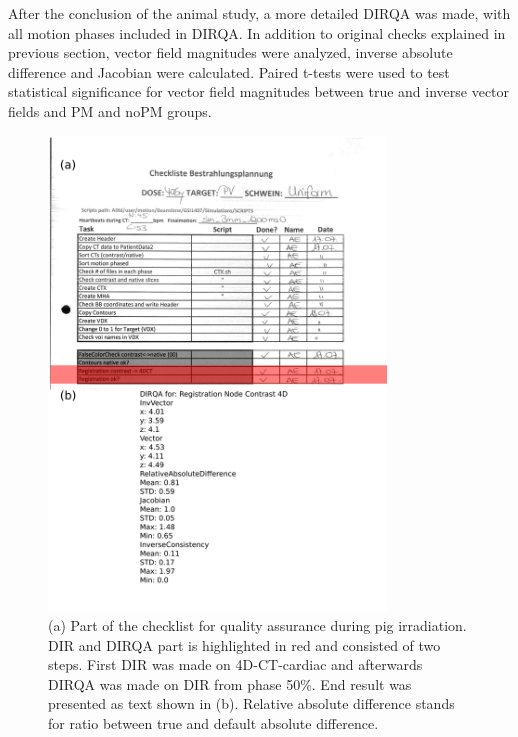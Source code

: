 \documentclass[type=dr, dr=rernat, accentcolor=tud7b,colorbacktitle, bigchapter, openright, twoside, 12pt ]{tudthesis}
\begin{document}
After the conclusion of the animal study, a more detailed DIRQA was made, with all motion phases included in DIRQA. In addition to original checks explained in previous section, vector field magnitudes were analyzed, inverse absolute difference
and Jacobian were calculated. Paired t-tests were used to test statistical significance for vector field magnitudes between true and inverse vector fields and PM and noPM groups.

\newpage
\begin{figure}[H]
	\begin{center}		
		\includegraphics[width=0.8\textwidth]{./Images/checkList.png}
		\caption{(a) Part of the checklist for quality assurance during pig irradiation. DIR and DIRQA part is highlighted in red and consisted of two steps. First DIR was made on 4D-CT-cardiac and afterwards DIRQA was made on
		DIR from phase 50\%. End result was presented as text shown in (b). Relative absolute difference stands for ratio between true and default absolute difference.}
		\label{checkList}
	\end{center}
\end{figure}
\newpage
\end{document}
